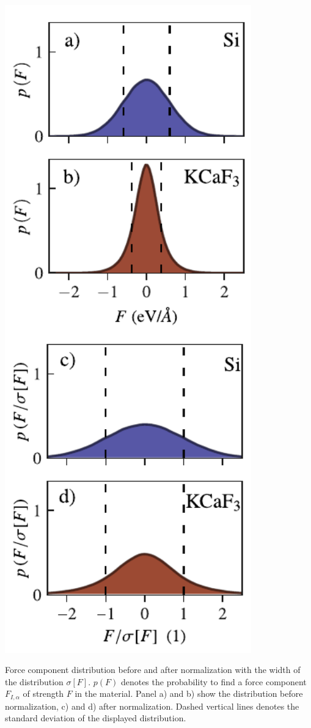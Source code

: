 \begin{marginfigure}
	\centering
	\includegraphics[width=0.8\textwidth]{./data/plots/anharmonicity/4_force_distribution/histogram_forces_vertical.pdf}
	\caption{
		Force component distribution before and after normalization with the width of the distribution $\sigma [F]$. $p(F)$ denotes the probability to find a force component $F_{I, \alpha}$ of strength $F$ in the material. Panel a) and b) show the distribution before normalization, c) and d) after normalization. Dashed vertical lines denotes the standard deviation of the displayed distribution.
	}
	\label{fig:anh.normalization}
\end{marginfigure}


